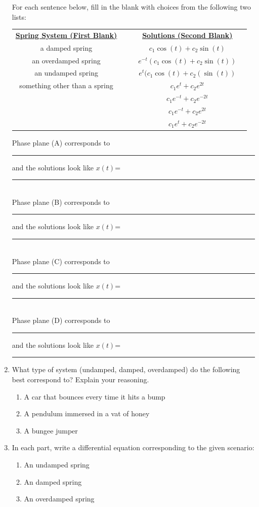 \begin{enumerate}
For each sentence below, fill in the blank with choices from the following two lists:

\begin{center}
\begin{tabular}{ccccc}
\textbf{\underline{Spring System (First Blank)}} &&& \textbf{\underline{Solutions (Second Blank)}} \\
a damped spring &&& $c_1\cos(t) + c_2\sin(t)$ \\
an overdamped spring &&& $e^{-t}(c_1\cos(t) + c_2\sin(t))$ \\
an undamped spring &&& $e^{t}(c_1\cos(t) + c_2(\sin(t))$ \\
something other than a spring &&& $c_1 e^t + c_2 e^{2t}$ \\
&&& $c_1 e^{-t} + c_2 e^{-2t}$ \\
&&& $c_1 e^{-t} + c_2 e^{2t}$ \\
&&& $c_1 e^t + c_2 e^{-2t}$	
\end{tabular}
\end{center}

Phase plane (A) corresponds to \rule{1in}{.5pt} and the solutions look like $x(t)$=\rule{1.5in}{.5pt} \\

Phase plane (B) corresponds to \rule{1in}{.5pt} and the solutions look like $x(t)$=\rule{1.5in}{.5pt} \\

Phase plane (C) corresponds to \rule{1in}{.5pt} and the solutions look like $x(t)$=\rule{1.5in}{.5pt} \\

Phase plane (D) corresponds to \rule{1in}{.5pt} and the solutions look like $x(t)$=\rule{1.5in}{.5pt}

\clearpage

\item What type of system (undamped, damped, overdamped) do the following best correspond to? Explain your reasoning. \label{11HWproblem5}
\begin{enumerate}
\item A car that bounces every time it hits a bump
\item A pendulum immersed in a vat of honey
\item A bungee jumper
\end{enumerate}

\item In each part, write a differential equation corresponding to the given scenario: \label{11HWproblem6}
\begin{enumerate}
\item An undamped spring
\item An damped spring
\item An overdamped spring
\end{enumerate}


\end{enumerate}
